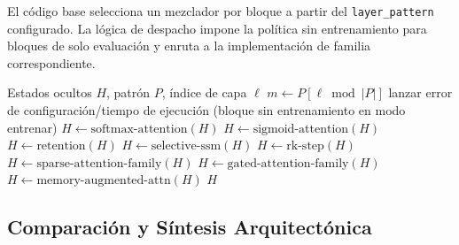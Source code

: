 El código base selecciona un mezclador por bloque a partir del \texttt{layer\_pattern} configurado. La lógica de despacho impone la política sin entrenamiento para bloques de solo evaluación y enruta a la implementación de familia correspondiente.

\begin{algorithm}[t]
\caption{Paso Adelante del Mezclador Guiado por Patrón (Conceptual)}
\begin{algorithmic}[1]
\Require Estados ocultos $H$, patrón $P$, índice de capa $\ell$
\State $m \gets P[\ell \bmod |P|]$
    \State lanzar error de configuración/tiempo de ejecución (bloque sin entrenamiento en modo entrenar)
    \State $H \gets \text{softmax-attention}(H)$
    \State $H \gets \text{sigmoid-attention}(H)$
    \State $H \gets \text{retention}(H)$
    \State $H \gets \text{selective-ssm}(H)$
    \State $H \gets \text{rk-step}(H)$
    \State $H \gets \text{sparse-attention-family}(H)$
    \State $H \gets \text{gated-attention-family}(H)$
\Else
    \State $H \gets \text{memory-augmented-attn}(H)$
\EndIf
\State \Return $H$
\end{algorithmic}
\end{algorithm}

\subsection{Comparación y Síntesis Arquitectónica}


